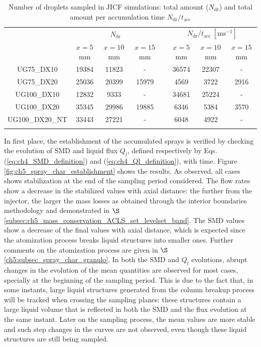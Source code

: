 \begin{table}[!h]
\centering
\caption{Number of droplets sampled in JICF simulations: total amount ($N_\mathrm{dr}$) and total amount per accumulation time $N_\mathrm{dr}/t_\mathrm{acc}$}
\begin{tabular}{cccccccc}
\thickhline
\multirow{2}{*}{ \textbf{Case}}  & \multicolumn{3}{c}{$N_\mathrm{dr}$} & & \multicolumn{3}{c}{$N_\mathrm{dr}/t_\mathrm{acc}~[\mathrm{ms}^{-1}]$} \\
\cline{2-4} \cline{6-8}
& $x = 5$ mm & $x = 10$ mm & $x = 15$ mm &  & $x = 5$ mm & $x = 10$ mm & $x = 15$ mm  \\
\thickhline 
UG75\_DX10  & 19384 & 11823 & -  & & 36574 & 22307 & - \\
UG75\_DX20  & 25036 & 20399 & 15979  & & 4569 & 3722 & 2916 \\
UG100\_DX10 & 12832 & 9333 & -  & & 34681 & 25224 & - \\
UG100\_DX20 & 35345 & 29986 & 19885  & & 6346 & 5384 & 3570 \\
UG100\_DX20\_NT & 33443 & 27221 & -  & & 6048 & 4922 & - \\
\thickhline
\end{tabular}
\label{tab:jicf_SLI_Ndr_accumulated}
\end{table}












In first place, the establishment of the accumulated sprays is verified by checking the evolution of SMD and liquid flux $Q_l$, defined respectively by Eqs. (\ref{eq:ch4_SMD_definition}) and (\ref{eq:ch4_Ql_definition}), with time. Figure \ref{fig:ch5_spray_char_establishment} shows the results. As observed, all cases shows stabilization at the end of the sampling period considered. The flow rates show a decrease in the stabilized values with axial distance: the further from the injector, the larger the mass losses as obtained through the interior boundaries methodology and demonstrated in $\S$\ref{subsec:ch5_mass_conservation_ACLS_set_levelset_band}. The SMD values show a decrease of the final values with axial distance, which is expected since the atomization process breaks liquid structures into smaller ones. Further comments on the atomization process are given in $\S$\ref{ch5:subsec_spray_char_granulo}. In both the SMD and $Q_l$ evolutions, abrupt changes in the evolution of the mean quantities are observed for most cases, specially at the beginning of the sampling period. This is due to the fact that, in some instants, large liquid structures generated from the column breakup process will be tracked when crossing the sampling planes: these structures contain a large liquid volume that is reflected in both the SMD and the flux evolution at the same instant. Later on the sampling process, the mean values are more stable and such step changes in the curves are not observed, even though these liquid structures are still being sampled.

